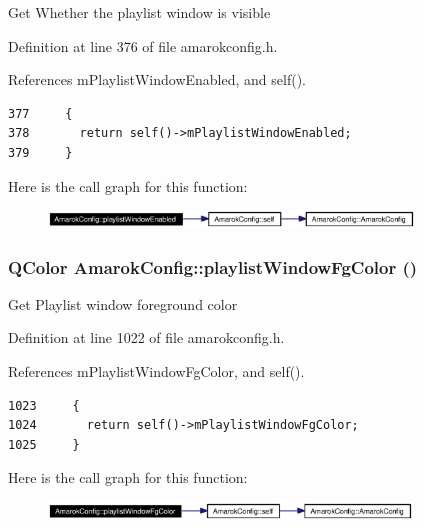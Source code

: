 Get Whether the playlist window is visible 

Definition at line 376 of file amarokconfig.h.

References m\-Playlist\-Window\-Enabled, and self().



\footnotesize\begin{verbatim}377     {
378       return self()->mPlaylistWindowEnabled;
379     }
\end{verbatim}\normalsize 


Here is the call graph for this function:\begin{figure}[H]
\begin{center}
\leavevmode
\includegraphics[width=275pt]{classAmarokConfig_AmarokConfige38_cgraph}
\end{center}
\end{figure}
\subsubsection{\setlength{\rightskip}{0pt plus 5cm}QColor Amarok\-Config::playlist\-Window\-Fg\-Color ()\hspace{0.3cm}{\tt  [inline, static]}}\label{classAmarokConfig_AmarokConfige106}


Get Playlist window foreground color 

Definition at line 1022 of file amarokconfig.h.

References m\-Playlist\-Window\-Fg\-Color, and self().



\footnotesize\begin{verbatim}1023     {
1024       return self()->mPlaylistWindowFgColor;
1025     }
\end{verbatim}\normalsize 


Here is the call graph for this function:\begin{figure}[H]
\begin{center}
\leavevmode
\includegraphics[width=274pt]{classAmarokConfig_AmarokConfige106_cgraph}
\end{center}
\end{figure}
